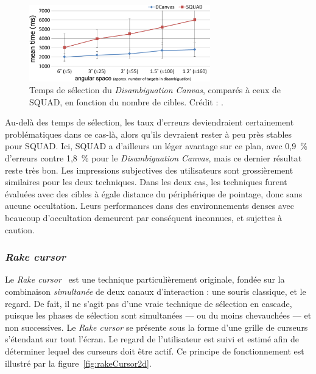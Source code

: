 	\begin{figure}[!htbp]
		\centering
		\includegraphics[width=0.7\textwidth]{figures/ch2/dCanvasSPerf}
		\caption[\emph{Disambiguation Canvas} -- performances II]{Temps de sélection du \emph{Disambiguation Canvas}, comparés à ceux de SQUAD, en fonction du nombre de cibles. Crédit : \cite{debarba2013disambiguation}.}
		\label{fig:dCanvasSPerf}
	\end{figure}
	
	Au-delà des temps de sélection, les taux d'erreurs deviendraient certainement problématiques dans ce cas-là, alors qu'ils devraient rester à peu près stables pour SQUAD. Ici, SQUAD a d'ailleurs un léger avantage sur ce plan, avec 0,9~\%{} d'erreurs contre 1,8~\%{} pour le \emph{Disambiguation Canvas}, mais ce dernier résultat reste très bon. Les impressions subjectives des utilisateurs sont grossièrement similaires pour les deux techniques. Dans les deux cas, les techniques furent évaluées avec des cibles à égale distance du périphérique de pointage, donc sans aucune occultation. Leurs performances dans des environnements denses avec beaucoup d'occultation demeurent par conséquent inconnues, et sujettes à caution.
	
	\subsubsection{\emph{Rake cursor}}
	Le \emph{Rake cursor}~\cite{blanch2009rake} est une technique particulièrement originale, fondée sur la combinaison \emph{simultanée} de deux canaux d'interaction : une souris classique, et le regard. De fait, il ne s'agit pas d'une \og vraie \fg{} technique de sélection en cascade, puisque les phases de sélection sont simultanées --- ou du moins chevauchées --- et non successives. Le \emph{Rake cursor} se présente sous la forme d'une grille de curseurs s'étendant sur tout l'écran. Le regard de l'utilisateur est suivi et estimé afin de déterminer lequel des curseurs doit être actif. Ce principe de fonctionnement est illustré par la figure~\ref{fig:rakeCursor2d}.
	

